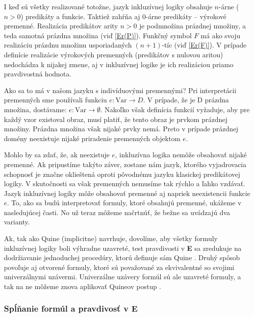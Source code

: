 \documentclass[12pt, letterpaper]{article}
\begin{document}
I keď sú všetky realizované totožne, jazyk inkluzívnej logiky obsahuje $n$-árne ($n > 0$) predikáty a funkcie. Taktiež zahŕňa aj 0-árne predikáty -- výrokové premenné. Realizácia predikátov arity $n > 0$ je podmnožina prázdnej množiny, a teda samotná prázdna množina (viď \ref{Er(P)}). Funkčný symbol $F$ má ako svoju realizáciu prázdnu množinu usporiadaných $(n+1)$-tíc (viď \ref{Er(F)}). V prípade definície realizácie výrokových premenných (predikátov s nulovou aritou) nedochádza k nijakej zmene, aj v inkluzívnej logike je ich realizáciou priamo pravdivostná hodnota.\par 

Ako sa to má v našom jazyku s indivíduovými premennými? Pri interpretácii premenných sme používali funkciu $e: \text{Var} \rightarrow D$. V prípade, že je D prázdna množina, dostávame: $e: \text{Var} \rightarrow \emptyset$. Nakoľko však definícia funkcií vyžaduje, aby pre každý vzor existoval obraz, musí platiť, že tento obraz je prvkom prázdnej množiny. Prázdna množina však nijaké prvky nemá. Preto v prípade prázdnej domény neexistuje nijaké priradenie premenných objektom $e$.\par 
Mohlo by sa zdať, že, ak neexistuje $e$, inkluzívna logika nemôže obsahovať nijaké premenné. Ak pripustíme takýto záver, zostane nám jazyk, ktorého vyjadrovacia schopnosť je značne oklieštená oproti pôvodnému jazyku klasickej predikátovej logiky. V skutočnosti sa však premenných nemusíme tak rýchlo a ľahko vzdávať. Jazyk inkluzívnej logiky môže obsahovať premenné aj napriek neexistencii funkcie $e$. To, ako sa budú interpretovať formuly, ktoré obsahujú premenné, ukážeme v nasledujúcej časti. No už teraz môžeme načrtnúť, že bežne sa uvádzajú dva varianty.\par
Ak, tak ako Quine (implicitne) navrhuje, dovolíme, aby všetky formuly inkluzívnej logiky boli výhradne uzavreté, test pravdivosti v \textbf{E} sa zredukuje na dodržiavanie jednoduchej procedúry, ktorú definuje sám Quine \parencites[197]{hailperin_quantification_1953}[177]{quine_quantification_1954}. Druhý spôsob povoľuje aj otvorené formuly, ktoré sú považované za ekvivalentné so svojimi univerzálnymi uzávermi. Univerzálne uzávery formúl sú ale uzavreté formuly, a tak na ne môžeme znova aplikovať Quineov postup \parencites[78]{leblanc_open_1969}.
\subsubsection{Spĺňanie formúl a pravdivosť v \textbf{E}}
\end{document}
